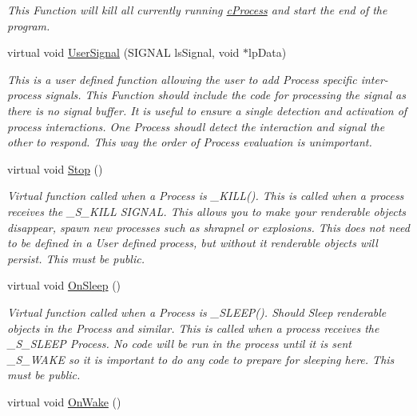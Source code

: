\begin{DoxyCompactItemize}
\begin{DoxyCompactList}\small\item\em This Function will kill all currently running \hyperlink{classc_process}{cProcess} and start the end of the program. \end{DoxyCompactList}\item 
virtual void \hyperlink{classc_process_a4e343b6a636669dc14103ff0d037f6f6}{UserSignal} (SIGNAL lsSignal, void $\ast$lpData)
\begin{DoxyCompactList}\small\item\em This is a user defined function allowing the user to add Process specific inter-\/process signals. This Function should include the code for processing the signal as there is no signal buffer. It is useful to ensure a single detection and activation of process interactions. One Process shoudl detect the interaction and signal the other to respond. This way the order of Process evaluation is unimportant. \end{DoxyCompactList}\item 
\hypertarget{classc_process_ab967568c0892c868c5904d27a91072c7}{
virtual void \hyperlink{classc_process_ab967568c0892c868c5904d27a91072c7}{Stop} ()}
\label{classc_process_ab967568c0892c868c5904d27a91072c7}

\begin{DoxyCompactList}\small\item\em Virtual function called when a Process is \_\-KILL(). This is called when a process receives the \_\-S\_\-KILL SIGNAL. This allows you to make your renderable objects disappear, spawn new processes such as shrapnel or explosions. This does not need to be defined in a User defined process, but without it renderable objects will persist. This must be public. \end{DoxyCompactList}\item 
\hypertarget{classc_process_ad9e66e8d1965e8974ef98121dc123bc5}{
virtual void \hyperlink{classc_process_ad9e66e8d1965e8974ef98121dc123bc5}{OnSleep} ()}
\label{classc_process_ad9e66e8d1965e8974ef98121dc123bc5}

\begin{DoxyCompactList}\small\item\em Virtual function called when a Process is \_\-SLEEP(). Should Sleep renderable objects in the Process and similar. This is called when a process receives the \_\-S\_\-SLEEP Process. No code will be run in the process until it is sent \_\-S\_\-WAKE so it is important to do any code to prepare for sleeping here. This must be public. \end{DoxyCompactList}\item 
\hypertarget{classc_process_a5d5c0f3e58dbe50b7859394f16102257}{
virtual void \hyperlink{classc_process_a5d5c0f3e58dbe50b7859394f16102257}{OnWake} ()}
\label{classc_process_a5d5c0f3e58dbe50b7859394f16102257}


\end{DoxyCompactItemize}
